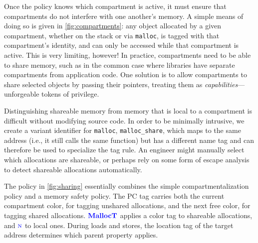 \documentclass{llncs}
\begin{document}
Once the policy knows which compartment is active, it must ensure that compartments do not interfere with
one another's memory. A simple means of doing so is given in \cref{fig:compartments}: any object allocated by
a given compartment, whether on the stack or via {\tt malloc}, is tagged with that compartment's identity,
and can only be accessed while that compartment is active.
This is very limiting, however! In practice, compartments need to be able to share memory, such as in the
common case where libraries have separate compartments from application code. One solution is to allow
compartments to share selected objects by passing their pointers, treating them as
{\em capabilities}---unforgeable tokens of privilege.

Distinguishing shareable memory from memory that is local to a compartment is difficult
without modifying source code. In order to be minimally intrusive, we
create a variant identifier for {\tt malloc}, {\tt malloc\_share}, which maps to the same
address (i.e., it still calls the same function) but has a different name tag and can therefore
be used to specialize the tag rule. An engineer might manually select which allocations are
shareable, or perhaps rely on some form of escape analysis to detect shareable allocations automatically.

The policy in \cref{fig:sharing} essentially combines the simple compartmentalization policy
and a memory safety policy. The PC tag carries both the current compartment color, for tagging
unshared allocations, and the next free color, for tagging shared allocations.
\(\color{blue} \mathbf{MallocT}\) applies a color tag to shareable allocations, and \(\textnormal{\color{blue} \sc n}\) to local ones.
During loads and stores, the location tag of the target address
determines which parent property applies.
\end{document}
